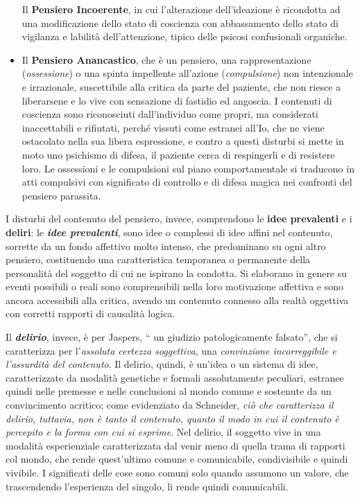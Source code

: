 \begin{itemize}
  Il \textbf{Pensiero Incoerente}, in cui l'alterazione dell'ideazione è
  ricondotta ad una modificazione dello stato di coscienza con
  abbassamento dello stato di vigilanza e labilità dell'attenzione,
  tipico delle psicosi confusionali organiche.
\item
  Il \textbf{Pensiero Anancastico}, che è un pensiero, una
  rappresentazione (\emph{ossessione}) o una spinta impellente
  all'azione (\emph{compulsione}) non intenzionale e irrazionale,
  suscettibile alla critica da parte del paziente, che non riesce a
  liberarsene e lo vive con sensazione di fastidio ed angoscia. I
  contenuti di coscienza sono riconosciuti dall'individuo come propri,
  ma considerati inaccettabili e rifiutati, perché vissuti come estranei
  all'Io, che ne viene ostacolato nella sua libera espressione, e contro
  a questi disturbi si mette in moto uno psichismo di difesa, il
  paziente cerca di respingerli e di resistere loro. Le ossessioni e le
  compulsioni sul piano comportamentale si traducono in atti compulsivi
  con significato di controllo e di difesa magica nei confronti del
  pensiero parassita.
\end{itemize}

I disturbi del contenuto del pensiero, invece, comprendono le
\textbf{idee prevalenti} e i \textbf{deliri}: le \textbf{\emph{idee
prevalenti}}, sono idee o complessi di idee affini nel contenuto,
sorrette da un fondo affettivo molto intenso, che predominano su ogni
altro pensiero, costituendo una caratteristica temporanea o permanente
della personalità del soggetto di cui ne ispirano la condotta. Si
elaborano in genere su eventi possibili o reali sono comprensibili nella
loro motivazione affettiva e sono ancora accessibili alla critica,
avendo un contenuto connesso alla realtà oggettiva con corretti rapporti
di causalità logica.

Il \textbf{\emph{delirio}}, invece, è per Jaspers, `` un giudizio
patologicamente falsato'', che si caratterizza per l'\emph{assoluta
certezza soggettiva}, una \emph{convinzione incorreggibile e l'assurdità
del contenuto}. Il delirio, quindi, è un'idea o un sistema di idee,
caratterizzate da modalità genetiche e formali assolutamente peculiari,
estranee quindi nelle premesse e nelle conclusioni al mondo comune e
sostenute da un convincimento acritico; come evidenziato da Schneider,
\emph{ciò che caratterizza il delirio, tuttavia, non è tanto il
contenuto, quanto il modo in cui il contenuto è percepito e la forma con
cui si esprime}. Nel delirio, il soggetto vive in una modalità
esperienziale caratterizzata dal venir meno di quella trama di rapporti
col mondo, che rende quest'ultimo comune e comunicabile, condivisibile e
quindi vivibile. I significati delle cose sono comuni solo quando
assumono un valore, che trascendendo l'esperienza del singolo, li rende
quindi comunicabili.

